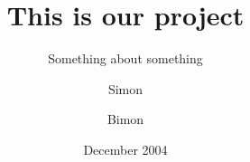 


\title{This is our project}
\subtitle{Something about something}
\author{Simon \and Bimon}
\date{December 2004}



\frontpage

\maketitle

\tableofcontents












\appendix



